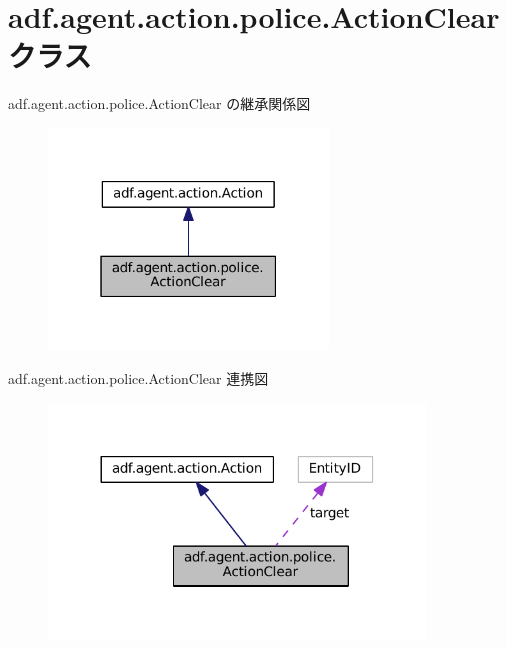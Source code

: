 \hypertarget{classadf_1_1agent_1_1action_1_1police_1_1ActionClear}{}\section{adf.\+agent.\+action.\+police.\+Action\+Clear クラス}
\label{classadf_1_1agent_1_1action_1_1police_1_1ActionClear}


adf.\+agent.\+action.\+police.\+Action\+Clear の継承関係図
\nopagebreak
\begin{figure}[H]
\begin{center}
\leavevmode
\includegraphics[width=211pt]{classadf_1_1agent_1_1action_1_1police_1_1ActionClear__inherit__graph}
\end{center}
\end{figure}


adf.\+agent.\+action.\+police.\+Action\+Clear 連携図
\nopagebreak
\begin{figure}[H]
\begin{center}
\leavevmode
\includegraphics[width=284pt]{classadf_1_1agent_1_1action_1_1police_1_1ActionClear__coll__graph}
\end{center}
\end{figure}
